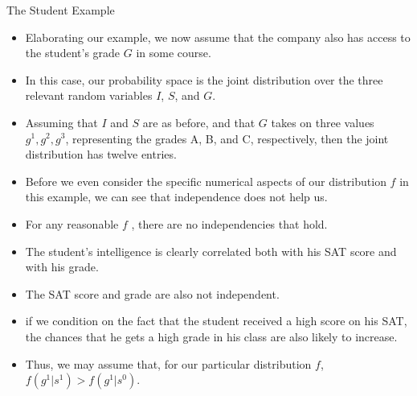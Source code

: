 \documentclass[handout]{beamer}
\begin{document}
\begin{frame}{The Student Example}
\scriptsize{
\begin{itemize}

\item Elaborating our example, we now assume that the company also has access to the student's grade $G$ in some course. 
\item In this case, our probability space is the joint distribution over the
three relevant random variables $I$, $S$, and $G$. 

\item Assuming that $I$ and $S$ are as before, and that $G$ takes on three values $g^1, g^2, g^3$, representing the grades A, B, and C, respectively, then the
joint distribution has twelve entries.

\item Before we even consider the specific numerical aspects of our distribution $f$ in this example, we can see that independence does not help us.
\item For any reasonable $f$ , there are no independencies that hold.
\item The student's intelligence is clearly correlated both with his SAT score and
with his grade.
\item The SAT score and grade are also not independent.
\item if we condition on the fact that the student received a high score on his SAT, the chances that he gets a high grade in his class are also likely to increase. \item Thus, we may assume that, for our particular distribution $f$,
$f(g^1|s^1) > f(g^1|s^0)$.


\end{itemize}



} 

\end{frame}
\end{document}
